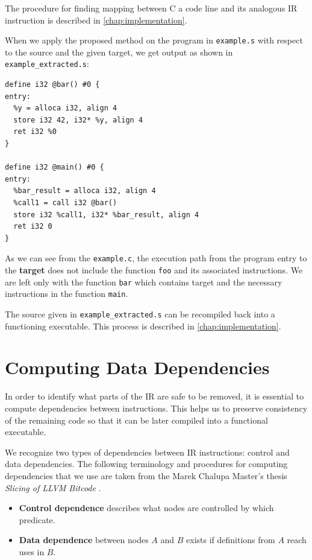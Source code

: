 \documentclass[12pt, twoside]{fithesis2}
\renewcommand{\_}{\leavevmode \kern0.07em\vbox{\hrule width0.4em}}
\newcommand{\squarebullet}{\textcolor{black}{\raisebox{0.15em}{\rule{4pt}{4pt}}}}
\newenvironment{myItemize}{
  \begin{itemize}[
    leftmargin=2em,
    rightmargin=1em,
    itemsep=\parskip,
    parsep=0em,
    topsep=0em,
    partopsep=0em
]
  \renewcommand{\labelitemi}{\squarebullet}
  \renewcommand{\labelitemii}{\textbullet}
}{
  \end{itemize}
}
\begin{document}
The procedure for finding mapping between C a code line and its analogous IR
instruction is described in \autoref{chap:implementation}.

When we apply the proposed method on the program in
\texttt{example.s} with respect to the source and the given target,
we get output as shown in \texttt{example_extracted.s}:

\begin{verbatim}
define i32 @bar() #0 {
entry:
  %y = alloca i32, align 4
  store i32 42, i32* %y, align 4
  ret i32 %0
}

define i32 @main() #0 {
entry:
  %bar_result = alloca i32, align 4
  %call1 = call i32 @bar()
  store i32 %call1, i32* %bar_result, align 4
  ret i32 0
}
\end{verbatim}

As we can see from the \texttt{example.c}, the execution path from
the program entry to the \textbf{target} does not include the function
\texttt{foo} and its associated instructions.
We are left only with the function \texttt{bar} which contains
target and the necessary instructions in the function \texttt{main}.

The source given in \texttt{example_extracted.s} can be recompiled
back into a functioning executable. This process is described in
\autoref{chap:implementation}.


\section{Computing Data Dependencies}
\label{sec:design-dep}

In order to identify what parts of the IR are safe to be removed, it is
essential to compute dependencies between instructions.
This helps us to preserve consistency of the remaining code so that it can be
later compiled into a functional executable.

We recognize two types of dependencies between IR instructions: control and
data dependencies.  The following terminology and procedures for computing
dependencies that we use are taken from the Marek Chalupa Master's thesis
\textit{Slicing of LLVM Bitcode} \cite{dg}.

\begin{myItemize}
\item \textbf{Control dependence} describes what nodes are controlled by which predicate.
\item \textbf{Data dependence} between nodes $A$ and $B$ exists if definitions
from $A$ reach uses in $B$.
\end{myItemize}
\end{document}
